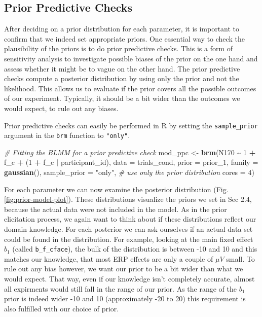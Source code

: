 \documentclass[
  doc,12pt,floatsintext]{apa7}
\newenvironment{Shaded}{\begin{snugshade}}{\end{snugshade}}
\newcommand{\AttributeTok}[1]{\textcolor[rgb]{0.13,0.29,0.53}{#1}}
\newcommand{\CommentTok}[1]{\textcolor[rgb]{0.56,0.35,0.01}{\textit{#1}}}
\newcommand{\DecValTok}[1]{\textcolor[rgb]{0.00,0.00,0.81}{#1}}
\newcommand{\FunctionTok}[1]{\textcolor[rgb]{0.13,0.29,0.53}{\textbf{#1}}}
\newcommand{\NormalTok}[1]{#1}
\newcommand{\OtherTok}[1]{\textcolor[rgb]{0.56,0.35,0.01}{#1}}
\newcommand{\SpecialCharTok}[1]{\textcolor[rgb]{0.81,0.36,0.00}{\textbf{#1}}}
\newcommand{\StringTok}[1]{\textcolor[rgb]{0.31,0.60,0.02}{#1}}
\begin{document}
\subsection{Prior Predictive Checks}\label{prior-predictive-checks}

After deciding on a prior distribution for each parameter, it is important to confirm that we indeed set appropriate priors. One essential way to check the plausibility of the priors is to do prior predictive checks. This is a form of sensitivity analysis to investigate possible biases of the prior on the one hand and assess whether it might be to vague on the other hand. The prior predictive checks compute a posterior distribution by using only the prior and not the likelihood. This allows us to evaluate if the prior covers all the possible outcomes of our experiment. Typically, it should be a bit wider than the outcomes we would expect, to rule out any biases.

Prior predictive checks can easily be performed in R by setting the \texttt{sample\_prior} argument in the \texttt{brm} function to \texttt{"only"}.

\begin{Shaded}
\begin{Highlighting}[]
\CommentTok{\# Fitting the BLMM for a prior predictive check}
\NormalTok{mod\_ppc }\OtherTok{\textless{}{-}} \FunctionTok{brm}\NormalTok{(N170 }\SpecialCharTok{\textasciitilde{}} \DecValTok{1} \SpecialCharTok{+}\NormalTok{ f\_c }\SpecialCharTok{+}\NormalTok{ (}\DecValTok{1} \SpecialCharTok{+}\NormalTok{ f\_c }\SpecialCharTok{|}\NormalTok{ participant\_id),}
               \AttributeTok{data =}\NormalTok{ trials\_cond, }
               \AttributeTok{prior =}\NormalTok{ prior\_1,}
               \AttributeTok{family =} \FunctionTok{gaussian}\NormalTok{(),}
               \AttributeTok{sample\_prior =} \StringTok{"only"}\NormalTok{, }\CommentTok{\# use only the prior distribution}
               \AttributeTok{cores =} \DecValTok{4}\NormalTok{) }
\end{Highlighting}
\end{Shaded}

For each parameter we can now examine the posterior distribution (Fig. \ref{fig:prior-model-plot}). These distributions visualize the priors we set in Sec 2.4, because the actual data were not included in the model. As in the prior elicitation process, we again want to think about if these distributions reflect our domain knowledge. For each posterior we can ask ourselves if an actual data set could be found in the distribution. For example, looking at the main fixed effect \(b_1\) (called \texttt{b\_f\_cface}), the bulk of the distribution is between -10 and 10 and this matches our knowledge, that most ERP effects are only a couple of \(\mu V\) small. To rule out any bias however, we want our prior to be a bit wider than what we would expect. That way, even if our knowledge isn't completely accurate, almost all expirments would still fall in the range of our prior. As the range of the \(b_1\) prior is indeed wider -10 and 10 (approximately -20 to 20) this requirement is also fulfilled with our choice of prior.
\end{document}
